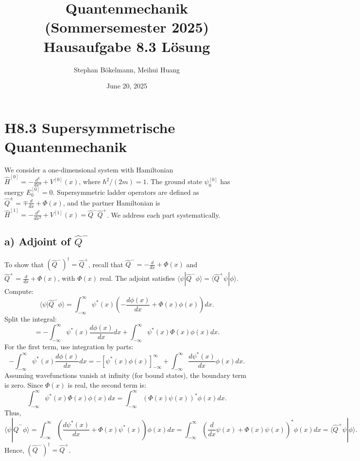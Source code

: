 \documentclass[a4paper,12pt]{article}
\begin{document}
\title{Quantenmechanik (Sommersemester 2025) \\ Hausaufgabe 8.3 Lösung}
\author{Stephan Bökelmann, Meihui Huang}
\date{June 20, 2025}
\maketitle

\section*{H8.3 Supersymmetrische Quantenmechanik}

We consider a one-dimensional system with Hamiltonian \(\hat{H}^{[0]} = -\frac{d^2}{dx^2} + V^{[0]}(x)\), where \(\hbar^2 / (2m) = 1\). The ground state \(\psi_0^{[0]}\) has energy \(E_0^{[0]} = 0\). Supersymmetric ladder operators are defined as \(\hat{Q}^\pm = \mp \frac{d}{dx} + \Phi(x)\), and the partner Hamiltonian is \(\hat{H}^{[1]} = -\frac{d^2}{dx^2} + V^{[1]}(x) = \hat{Q}^- \hat{Q}^+\). We address each part systematically.

\subsection*{a) Adjoint of \(\hat{Q}^-\)}

To show that \((\hat{Q}^-)^\dagger = \hat{Q}^+\), recall that \(\hat{Q}^- = -\frac{d}{dx} + \Phi(x)\) and \(\hat{Q}^+ = \frac{d}{dx} + \Phi(x)\), with \(\Phi(x)\) real. The adjoint satisfies \(\langle \psi | \hat{Q}^- \phi \rangle = \langle \hat{Q}^+ \psi | \phi \rangle\). Compute:
\[
\langle \psi | \hat{Q}^- \phi \rangle = \int_{-\infty}^\infty \psi^*(x) \left( -\frac{d \phi(x)}{dx} + \Phi(x) \phi(x) \right) dx.
\]
Split the integral:
\[
= -\int_{-\infty}^\infty \psi^*(x) \frac{d \phi(x)}{dx} dx + \int_{-\infty}^\infty \psi^*(x) \Phi(x) \phi(x) dx.
\]
For the first term, use integration by parts:
\[
-\int_{-\infty}^\infty \psi^*(x) \frac{d \phi(x)}{dx} dx = -\left[ \psi^*(x) \phi(x) \right]_{-\infty}^\infty + \int_{-\infty}^\infty \frac{d \psi^*(x)}{dx} \phi(x) dx.
\]
Assuming wavefunctions vanish at infinity (for bound states), the boundary term is zero. Since \(\Phi(x)\) is real, the second term is:
\[
\int_{-\infty}^\infty \psi^*(x) \Phi(x) \phi(x) dx = \int_{-\infty}^\infty \left( \Phi(x) \psi(x) \right)^* \phi(x) dx.
\]
Thus,
\[
\langle \psi | \hat{Q}^- \phi \rangle = \int_{-\infty}^\infty \left( \frac{d \psi^*(x)}{dx} + \Phi(x) \psi^*(x) \right) \phi(x) dx = \int_{-\infty}^\infty \left( \frac{d}{dx} \psi(x) + \Phi(x) \psi(x) \right)^* \phi(x) dx = \langle \hat{Q}^+ \psi | \phi \rangle.
\]
Hence, \((\hat{Q}^-)^\dagger = \hat{Q}^+\).
\end{document}
